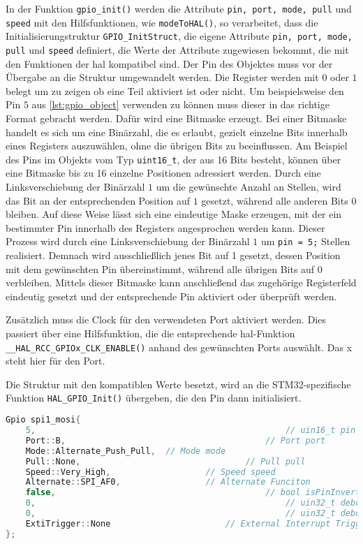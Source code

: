 In der Funktion \texttt{gpio\_init()} werden die Attribute \texttt{pin, port, mode, pull} und \texttt{speed} mit den Hilfsfunktionen, wie \texttt{modeToHAL()}, so verarbeitet, dass die Initialisierungstruktur \texttt{GPIO\_InitStruct}, die eigene Attribute \texttt{pin, port, mode, pull} und \texttt{speed} definiert, die Werte der Attribute zugewiesen bekommt, die mit den Funktionen der \gls{hal} kompatibel sind.
Der Pin des Objektes muss vor der Übergabe an die Struktur umgewandelt werden.
Die Register werden mit $0$ oder $1$ belegt um zu zeigen ob eine Teil aktiviert ist oder nicht.
Um beispielsweise den Pin $5$ aus \cref{lst:gpio_object} verwenden zu können muss dieser in das richtige Format gebracht werden.
Dafür wird eine Bitmaske erzeugt. 
Bei einer Bitmaske handelt es sich um eine Binärzahl, die es erlaubt, gezielt einzelne Bits innerhalb eines Registers auszuwählen, ohne die übrigen Bits zu beeinflussen. 
Am Beispiel des Pins im Objekts vom Typ \texttt{uint16\_t}, der aus 16 Bits besteht, können über eine Bitmaske bis zu 16 einzelne Positionen adressiert werden. 
Durch eine Linksverschiebung der Binärzahl $1$ um die gewünschte Anzahl an Stellen, wird das Bit an der entsprechenden Position auf $1$ gesetzt, während alle anderen Bits $0$ bleiben. 
Auf diese Weise lässt sich eine eindeutige Maske erzeugen, mit der ein bestimmter Pin innerhalb des Registers angesprochen werden kann.
Dieser Prozess wird durch eine Linksverschiebung der Binärzahl $1$ um \texttt{pin = 5;} Stellen realisiert. 
Demnach wird ausschließlich jenes Bit auf 1 gesetzt, dessen Position mit dem gewünschten Pin übereinstimmt, während alle übrigen Bits auf 0 verbleiben. 
Mittels dieser Bitmaske kann anschließend das zugehörige Registerfeld eindeutig gesetzt und der entsprechende Pin aktiviert oder überprüft werden.

Zusätzlich muss die Clock für den verwendeten Port aktiviert werden.
Dies passiert über eine Hilfsfunktion, die die entsprechende \gls{hal}-Funktion \texttt{\_\_HAL\_RCC\_GPIOx\_CLK\_ENABLE()} anhand des gewünschten Ports auswählt.
Das x steht hier für den Port.

Die Struktur mit den kompatiblen Werte besetzt, wird an die STM32-spezifische Funktion \texttt{HAL\_GPIO\_Init()} übergeben, die den Pin dann initialisiert.

\begin{lstlisting}[language=C++, caption={Beispiel eines Gpio Objektes.}, label={lst:gpio_object}]
Gpio spi1_mosi{
	5, 													// uin16_t pin
	Port::B, 										// Port port
	Mode::Alternate_Push_Pull,	// Mode mode
	Pull::None, 								// Pull pull
	Speed::Very_High, 					// Speed speed
	Alternate::SPI_AF0, 				// Alternate Funciton
	false, 											// bool isPinInverted
	0, 													// uin32_t debounceTime
	0, 													// uin32_t debounceState
	ExtiTrigger::None						// External Interrupt Trigger
};
\end{lstlisting}

